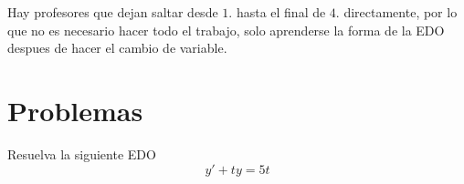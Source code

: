 \documentclass[a4paper,oneside,10.5pt]{article}
\begin{document}
\begin{obs}
 Hay profesores que dejan saltar desde $1.$ hasta el final de $4.$ directamente, por lo que no es necesario hacer todo el trabajo, solo aprenderse la forma de la EDO despues de hacer el cambio de variable.
\end{obs}

\begin{ejemplo}

\end{ejemplo}

\section*{Problemas}
\begin{prob}
  Resuelva la siguiente EDO
  \begin{equation*}
    y' + ty = 5t
  \end{equation*}

\end{prob}
\end{document}
